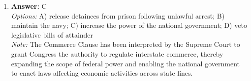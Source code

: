 \documentclass[12pt]{article}
\begin{document}
\begin{enumerate}[label=\arabic*.]
\\ \textit{Note:} The Articles of Confederation granted states the power to coin money independently, while the Constitution centralized this authority under the federal government, prohibiting states from issuing their own currency.
\item \textbf{Answer:} C
\\ \textit{Options:} A) release detainees from prison following unlawful arrest; B) maintain the navy; C) increase the power of the national government; D) veto legislative bills of attainder
\\ \textit{Note:} The Commerce Clause has been interpreted by the Supreme Court to grant Congress the authority to regulate interstate commerce, thereby expanding the scope of federal power and enabling the national government to enact laws affecting economic activities across state lines.
\end{enumerate}
\end{document}
